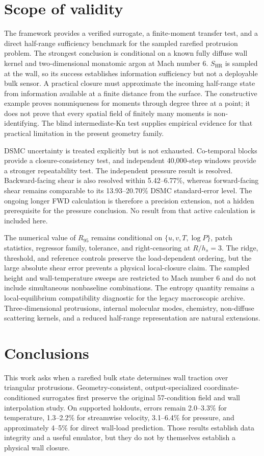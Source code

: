 \documentclass[aip,pof,preprint,floatfix,amsmath,amssymb]{revtex4-2}
\newcommand{\Kn}{\mathrm{Kn}}
\begin{document}
\section{Scope of validity}
The framework provides a verified surrogate, a finite-moment transfer test, and a direct half-range sufficiency benchmark for the sampled rarefied protrusion problem. The strongest conclusion is conditional on a known fully diffuse wall kernel and two-dimensional monatomic argon at Mach number 6. $S_{\mathrm{HR}}$ is sampled at the wall, so its success establishes information sufficiency but not a deployable bulk sensor. A practical closure must approximate the incoming half-range state from information available at a finite distance from the surface. The constructive example proves nonuniqueness for moments through degree three at a point; it does not prove that every spatial field of finitely many moments is non-identifying. The blind intermediate-$\Kn$ test supplies empirical evidence for that practical limitation in the present geometry family.

DSMC uncertainty is treated explicitly but is not exhausted. Co-temporal blocks provide a closure-consistency test, and independent 40,000-step windows provide a stronger repeatability test. The independent pressure result is resolved. Backward-facing shear is also resolved within 5.42--6.77\%, whereas forward-facing shear remains comparable to its 13.93--20.70\% DSMC standard-error level. The ongoing longer FWD calculation is therefore a precision extension, not a hidden prerequisite for the pressure conclusion. No result from that active calculation is included here.

The numerical value of $R_{95}$ remains conditional on $\{u,v,T,\log P\}$, patch statistics, regressor family, tolerance, and right-censoring at $R/h_s=3$. The ridge, threshold, and reference controls preserve the load-dependent ordering, but the large absolute shear error prevents a physical local-closure claim. The sampled height and wall-temperature sweeps are restricted to Mach number 6 and do not include simultaneous nonbaseline combinations. The entropy quantity remains a local-equilibrium compatibility diagnostic for the legacy macroscopic archive. Three-dimensional protrusions, internal molecular modes, chemistry, non-diffuse scattering kernels, and a reduced half-range representation are natural extensions.

\section{Conclusions}
This work asks when a rarefied bulk state determines wall traction over triangular protrusions. Geometry-consistent, output-specialized coordinate-conditioned surrogates first preserve the original 57-condition field and wall interpolation study. On supported holdouts, errors remain 2.0--3.3\% for temperature, 1.3--2.2\% for streamwise velocity, 3.1--6.4\% for pressure, and approximately 4--5\% for direct wall-load prediction. Those results establish data integrity and a useful emulator, but they do not by themselves establish a physical wall closure.
\end{document}
